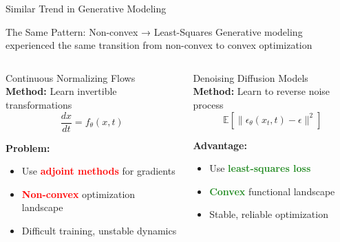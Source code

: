 \documentclass[aspectratio=169,xcolor=dvipsnames]{beamer}
\begin{document}
\begin{frame}{Similar Trend in Generative Modeling}
    \vspace{-0.1cm}
    
    \begin{block}{The Same Pattern: Non-convex → Least-Squares}
        Generative modeling experienced the same transition from non-convex to convex optimization
    \end{block}
        
    \vspace{-0.4cm}

    \begin{columns}[t]
        \begin{alertblock}{Continuous Normalizing Flows}
            \small
            \textbf{Method:} Learn invertible transformations
            \begin{equation}
            \frac{dx}{dt} = f_\theta(x, t)
            \end{equation}
            
            \textbf{Problem:}
            \begin{itemize}
                \item Use \textcolor{red}{\textbf{adjoint methods}} for gradients
                \item \textcolor{red}{\textbf{Non-convex}} optimization landscape
                \item Difficult training, unstable dynamics
            \end{itemize}
        \end{alertblock}
        
        \begin{block}{Denoising Diffusion Models}
            \small
            \textbf{Method:} Learn to reverse noise process
            \begin{equation}
            \mathbb{E}[\|\epsilon_\theta(x_t, t) - \epsilon\|^2]
            \end{equation}
            
            \textbf{Advantage:}
            \begin{itemize}
                \item Use \textcolor{ForestGreen}{\textbf{least-squares loss}} 
                \item \textcolor{ForestGreen}{\textbf{Convex}} functional landscape
                \item Stable, reliable optimization
            \end{itemize}
        \end{block}
    \end{columns}
        

\end{frame}
\end{document}
